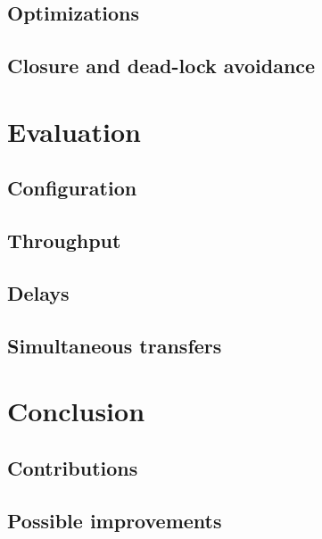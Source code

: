 \documentclass[journal]{IEEEtran}
\begin{document}
\subsection{Optimizations}



\subsection{Closure and dead-lock avoidance}






\section{Evaluation}


\subsection{Configuration}

\subsection{Throughput}





\subsection{Delays}

\subsection{Simultaneous transfers}






\section{Conclusion}

\subsection{Contributions}


\subsection{Possible improvements}
\end{document}
